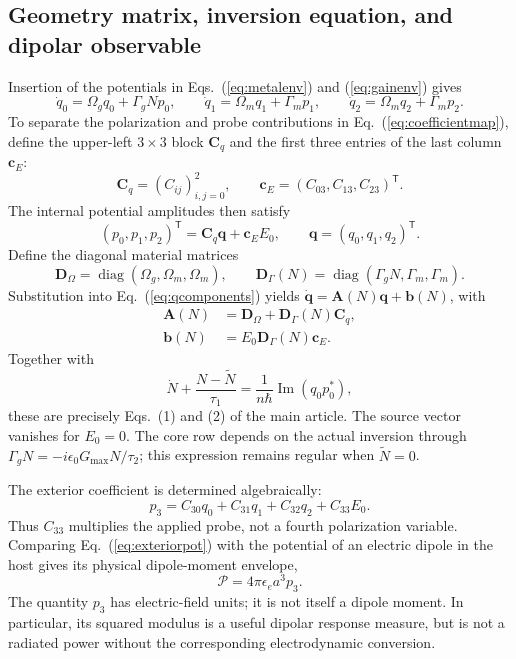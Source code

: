 \documentclass[9pt]{osa-supplemental-document}
\begin{document}
\subsection{Geometry matrix, inversion equation, and dipolar observable}
Insertion of the potentials in Eqs.~(\ref{eq:metalenv}) and (\ref{eq:gainenv}) gives
\begin{equation}
\dot q_0=\Omega_gq_0+\Gamma_gNp_0,\qquad
\dot q_1=\Omega_mq_1+\Gamma_mp_1,\qquad
\dot q_2=\Omega_mq_2+\Gamma_mp_2.
\label{eq:qcomponents}
\end{equation}
To separate the polarization and probe contributions in Eq.~(\ref{eq:coefficientmap}), define the upper-left $3\times3$ block $\mathbf C_q$ and the first three entries of the last column $\mathbf c_E$:
\begin{equation}
\mathbf C_q=(C_{ij})_{i,j=0}^{2},\qquad
\mathbf c_E=(C_{03},C_{13},C_{23})^{\mathsf T}.
\label{eq:Cblocks}
\end{equation}
The internal potential amplitudes then satisfy
\begin{equation}
(p_0,p_1,p_2)^{\mathsf T}=\mathbf C_q\mathbf q+\mathbf c_EE_0,
\qquad \mathbf q=(q_0,q_1,q_2)^{\mathsf T}.
\label{eq:internalpotentials}
\end{equation}
Define the diagonal material matrices
\begin{equation}
\mathbf D_\Omega=\operatorname{diag}(\Omega_g,\Omega_m,\Omega_m),\qquad
\mathbf D_\Gamma(N)=\operatorname{diag}(\Gamma_gN,\Gamma_m,\Gamma_m).
\label{eq:materialmatrices}
\end{equation}
Substitution into Eq.~(\ref{eq:qcomponents}) yields $\dot{\mathbf q}=\mathbf A(N)\mathbf q+\mathbf b(N)$, with
\begin{align}
\mathbf A(N)&=\mathbf D_\Omega+\mathbf D_\Gamma(N)\mathbf C_q,\label{eq:A}\\
\mathbf b(N)&=E_0\mathbf D_\Gamma(N)\mathbf c_E.\label{eq:b}
\end{align}
Together with
\begin{equation}
\dot N+\frac{N-\widetilde N}{\tau_1}
=\frac{1}{n\hbar}\operatorname{Im}(q_0p_0^*),
\label{eq:Nscalar}
\end{equation}
these are precisely Eqs.~(1) and (2) of the main article. The source vector vanishes for $E_0=0$. The core row depends on the actual inversion through $\Gamma_gN=-i\epsilon_0G_{\max}N/\tau_2$; this expression remains regular when $\widetilde N=0$.

The exterior coefficient is determined algebraically:
\begin{equation}
p_3=C_{30}q_0+C_{31}q_1+C_{32}q_2+C_{33}E_0.
\label{eq:p3}
\end{equation}
Thus $C_{33}$ multiplies the applied probe, not a fourth polarization variable. Comparing Eq.~(\ref{eq:exteriorpot}) with the potential of an electric dipole in the host gives its physical dipole-moment envelope,
\begin{equation}
\mathcal P=4\pi\epsilon_e a^3p_3.
\label{eq:dipole}
\end{equation}
The quantity $p_3$ has electric-field units; it is not itself a dipole moment. In particular, its squared modulus is a useful dipolar response measure, but is not a radiated power without the corresponding electrodynamic conversion.
\end{document}
